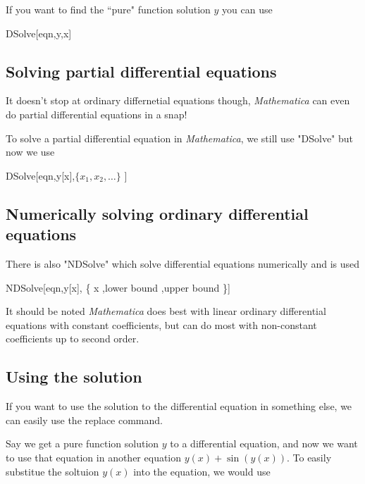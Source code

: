 \documentclass[11pt,a4paper,twoside]{article}
\begin{document}
				If you want to find the ``pure" function solution $y$ you can use
				
				\begin{center} DSolve[eqn,y,x] \end{center}

			\subsection{Solving partial differential equations}
						
				It doesn't stop at ordinary differnetial equations though, \textit{Mathematica} can even do partial differential equations in a snap!
							
				To solve a partial differential equation in \textit{Mathematica}, we still use "DSolve" but now we use
							
				\begin{center} DSolve[eqn,y[x],$\{ x_1, x_2, \dots \}$ ] \end{center}
							
			\subsection{Numerically solving ordinary differential equations}
							
				There is also "NDSolve" which solve differential equations numerically and is used 
						
				\begin{center} NDSolve[eqn,y[x], \{ x ,lower bound ,upper bound \}] \end{center}
					
			It should be noted \textit{Mathematica} does best with linear ordinary differential equations with constant coefficients, but can do most with non-constant coefficients up to second order.
			
			\subsection{Using the solution}
			
				If you want to use the solution to the differential equation in something else, we can easily use the replace command.
				
				Say we get a pure function solution $y$ to a differential equation, and now we want to use that equation in another equation $y(x) + \sin(y(x))$.  To easily substitue the soltuion $y(x)$ into the equation, we would use
				
\end{document}
